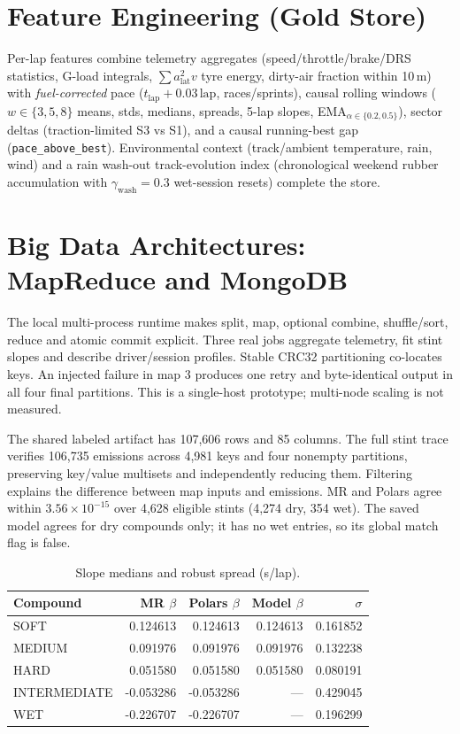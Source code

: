 \documentclass[11pt]{article}
\begin{document}
\section{Feature Engineering (Gold Store)}
Per-lap features combine telemetry aggregates (speed/throttle/brake/DRS
statistics, G-load integrals, $\sum a_{\text{lat}}^2 v$ tyre energy,
dirty-air fraction within 10\,m) with \emph{fuel-corrected} pace
($t_{\text{lap}} + 0.03\,\text{lap}$, races/sprints), causal rolling windows
($w\in\{3,5,8\}$ means, stds, medians, spreads, 5-lap slopes,
EMA$_{\alpha\in\{0.2,0.5\}}$), sector deltas (traction-limited S3 vs S1), and a
causal running-best gap (\texttt{pace\_above\_best}). Environmental context
(track/ambient temperature, rain, wind) and a rain wash-out track-evolution
index (chronological weekend rubber accumulation with $\gamma_{\text{wash}}=0.3$
wet-session resets) complete the store.

\section{Big Data Architectures: MapReduce and MongoDB}
The local multi-process runtime makes split, map, optional combine,
shuffle/sort, reduce and atomic commit explicit. Three real jobs aggregate
telemetry, fit stint slopes and describe driver/session profiles. Stable
CRC32 partitioning co-locates keys. An injected failure in map 3 produces
one retry and byte-identical output in all four final partitions.
This is a single-host prototype; multi-node scaling is not measured.

The shared labeled artifact has 107,606 rows and 85 columns. The full
stint trace verifies 106,735 emissions across 4,981 keys and four nonempty
partitions, preserving key/value multisets and independently reducing them.
Filtering explains the difference between map inputs and emissions.
MR and Polars agree within $3.56\times10^{-15}$ over 4,628 eligible stints
(4,274 dry, 354 wet). The saved model agrees for dry compounds only;
it has no wet entries, so its global match flag is false.
\begin{table}[!htbp]\centering\scriptsize
\caption{Slope medians and robust spread (s/lap).}
\label{tab:phase9-parity}
\begin{tabular}{lrrrr}\toprule
Compound & MR $\beta$ & Polars $\beta$ & Model $\beta$ & $\sigma$ \\
\midrule
SOFT & 0.124613 & 0.124613 & 0.124613 & 0.161852 \\
MEDIUM & 0.091976 & 0.091976 & 0.091976 & 0.132238 \\
HARD & 0.051580 & 0.051580 & 0.051580 & 0.080191 \\
INTERMEDIATE & -0.053286 & -0.053286 & --- & 0.429045 \\
WET & -0.226707 & -0.226707 & --- & 0.196299 \\
\bottomrule\end{tabular}\end{table}
\end{document}
